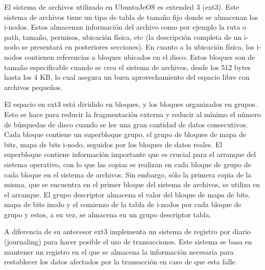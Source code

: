 \documentclass[a4paper,11pt] {article}
\begin{document}
\begin{enumerate}
\begin{enumerate}
			El sistema de archivos utilizado en UbuntuJeOS es extended 3 (ext3). Este sistema de archivos tiene un tipo de tabla de tamaño fijo donde se almacenan los i-nodos. Estos almacenan información del archivo como por ejemplo la ruta o path, tamaño, permisos, ubicación física, etc (la descripción completa de un i-nodo se presentará en posteriores secciones). En cuanto a la ubicación física, los i-nodos contienen referencias a bloques ubicados en el disco. Estos bloques son de tamaño especificable cuando se crea el sistema de archivos, desde los 512 bytes hasta los 4 KB, lo cual asegura un buen aprovechamiento del espacio libre con archivos pequeños.

			El espacio en ext3 está dividido en bloques, y los bloques organizados en grupos. Esto se hace para reducir la fragmentación externa y reducir al mínimo el número de búsquedas de disco cuando se lee una gran cantidad de datos consecutivos.
			Cada bloque contiene un superbloque grupo, el grupo de bloques de mapa de bits, mapa de bits i-nodo, seguidos por los bloques de datos reales.
			El superbloque contiene información importante que es crucial para el arranque del sistema operativo, con lo que las copias se realizan en cada bloque de grupo de cada bloque en el sistema de archivos. Sin embargo, sólo la primera copia de la misma, que se encuentra en el primer bloque del sistema de archivos, se utiliza en el arranque.
			El grupo descriptor almacena el valor del bloque de mapa de bits, mapa de bits inodo y el comienzo de la tabla de i-nodos por cada bloque de grupo y estos, a su vez, se almacena en un grupo descriptor tabla.
	
			A diferencia de su antecesor ext3 implementa un sistema de registro por diario (journaling) para hacer posible el uso de transacciones. Este sistema se basa en mantener un registro en el que se almacena la información necesaria para restablecer los datos afectados por la transacción en caso de que esta falle.


\end{enumerate}
\end{enumerate}
\end{document}
